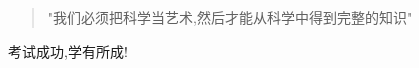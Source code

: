 \begin{frame} 
	\begin{quotation}
		"我们必须把科学当艺术,然后才能从科学中得到完整的知识"  \\
	\end{quotation}
\end{frame}

\begin{frame}[plain]
    \Background[2] 
	\begin{center}
		{\huge \color{deepred} 考试成功,学有所成! }
	\end{center}
    \addtocounter{framenumber}{-1} 
\end{frame}